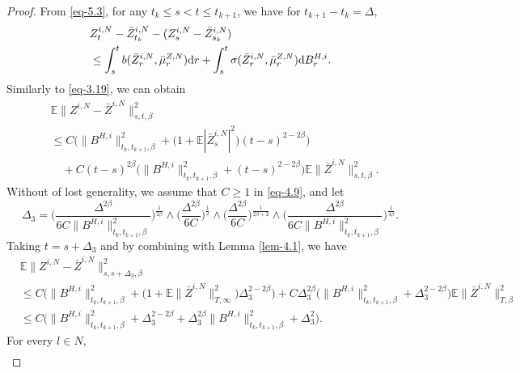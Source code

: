 \documentclass[10pt,a4paper]{amsart}
\def\E{\mathbb E}
\def\d{\text{\rm{d}}}
\begin{document}
\begin{proof}
From \eqref{eq-5.3}, for any $t_k\leq s < t \leq t_{k+1}$, we have for $t_{k+1}-t_k=\Delta$,
\begin{equation}
	\begin{aligned}
		&Z_{t}^{i,N}-\bar Z_{t_k}^{i,N}-(Z_{s}^{i,N}-\bar Z_{s_k}^{i,N})\\
		&\leq \int_{s}^{t}b(\bar Z_{r}^{i,N},\bar \mu_{r}^{Z,N})\d r+\int_{s}^{t}\sigma(\bar Z_{r}^{i,N},\bar \mu_{r}^{Z,N})\d B^{H,i}_{r}.
	\end{aligned}
\end{equation}
Similarly to \eqref{eq-3.19},  we can obtain
\begin{equation}\label{eq-4.9}
	\begin{aligned}
		&\E\|Z^{i,N}-\bar{Z}^{i,N}\|^2_{s,t,\beta}\\
		&\leq C\Big(\|B^{H,i}\|^2_{t_k,t_{k+1},\beta}+\big(1+\E|\bar Z^{i,N}_s|^2\big)(t-s)^{2-2\beta}\Big)\\
		&\quad+C(t-s)^{2\beta}\Big(\|B^{H,i}\|^2_{t_k,t_{k+1},\beta}+(t-s)^{2-2\beta}\Big)\E\|\bar Z^{i,N}\|^2_{s,t,\beta}.
	\end{aligned}
\end{equation}	
Without of lost generality, we assume that $C \geq 1$ in \eqref{eq-4.9}, and let
\begin{equation}
	\Delta_3=\Big(\frac{ \Delta^{2\beta}}{6C\|B^{H,i}\|^2_{t_k,t_{k+1},\beta}}\Big)^{\frac{1}{2\beta}}\wedge \Big(\frac{ \Delta^{2\beta}}{6C}\Big)^{\frac{1}{2}}\wedge \Big(\frac{ \Delta^{2\beta}}{6C}\Big)^{\frac{1}{2\beta+2}}\wedge \Big(\frac{ \Delta^{2\beta}}{6C\|B^{H,i}\|^2_{t_k,t_{k+1},\beta}}\Big)^{\frac{1}{4\beta}}.
\end{equation}
Taking $t=s+\Delta_3$ and by combining with Lemma \ref{lem-4.1}, we have
\begin{equation}
	\begin{aligned}
		&\E\|Z^{i,N}-\bar{Z}^{i,N}\|^2_{s,s+\Delta_3,\beta}\\
		&\leq C\Big(\|B^{H,i}\|^2_{t_k,t_{k+1},\beta}+\big(1+\E\|\bar Z^{i,N}\|^2_{T,\infty}\big)\Delta_3^{2-2\beta}\Big)+C\Delta_3^{2\beta}\Big(\|B^{H,i}\|^2_{t_k,t_{k+1},\beta}+\Delta_3^{2-2\beta}\Big)\E\|\bar Z^{i,N}\|^2_{T,\beta}\\
		&\leq C\Big(\|B^{H,i}\|^2_{t_k,t_{k+1},\beta}+\Delta_3^{2-2\beta}+\Delta_3^{2\beta}\|B^{H,i}\|^2_{t_k,t_{k+1},\beta}+\Delta_3^2\Big).
	\end{aligned}
\end{equation}	
For every $l\in N$,
\begin{align*}

\end{align*}
\end{proof}
\end{document}
